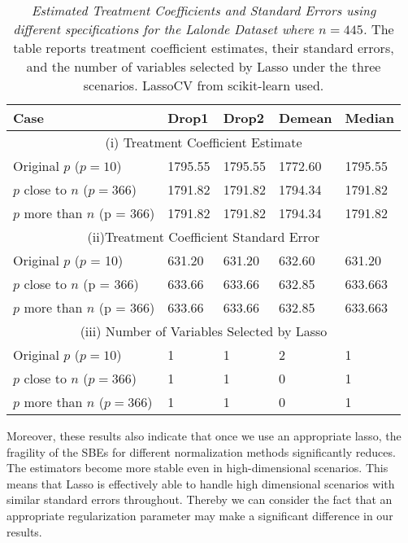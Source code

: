 \begin{table}[h!]
\renewcommand{\arraystretch}{1.5}
\centering
\begin{tabular}{||l l l l l||} 
 \hline
 \hline
 Case & Drop1 & Drop2 & Demean & Median \\ [0.5ex] 
 \hline \hline
 \multicolumn{5}{||c||}{(i) Treatment Coefficient Estimate} \\ [0.5ex]
 Original $p$ ($p = 10$) & 1795.55 & 1795.55 & 1772.60 & 1795.55  \\ 
 $p$ close to $n$ ($p = 366$) & 1791.82 & 1791.82 & 1794.34 & 1791.82 \\
 $p$ more than $n$ (p = 366) & 1791.82 & 1791.82 & 1794.34 & 1791.82  \\
 \hline
 \multicolumn{5}{||c||}{(ii)Treatment Coefficient Standard Error} \\ [0.5ex]
 Original $p$ ($p$ = 10) & 631.20 & 631.20 & 632.60 & 631.20 \\ 
 $p$ close to $n$ (p = 366) & 633.66 & 633.66& 632.85 & 633.663  \\
 $p$ more than $n$ (p = 366) & 633.66 & 633.66& 632.85 & 633.663 \\
 \hline
 \multicolumn{5}{||c||}{(iii) Number of Variables Selected by Lasso} \\ [0.5ex]
 Original $p$ ($p = 10$) & 1 & 1 & 2 & 1 \\ 
 $p$ close to $n$ ($p = 366$) & 1 & 1 & 0 & 1 \\
 $p$ more than $n$ ($p = 366$) & 1 & 1 & 0 & 1 \\
 \hline \hline
\end{tabular}
\caption{\textit{Estimated Treatment Coefficients and Standard Errors using different specifications for the Lalonde Dataset where $n = 445$.} The table reports treatment coefficient estimates, their standard errors, and the number of variables selected by Lasso under the three scenarios. LassoCV from scikit-learn used.}
\label{table:1}
\end{table}

Moreover, these results also indicate that once we use an appropriate lasso, the fragility of the SBEs for different normalization methods significantly reduces. The estimators become more stable even in high-dimensional scenarios. This means that Lasso is effectively able to handle high dimensional scenarios with similar standard errors throughout. Thereby we can consider the fact that an appropriate regularization parameter may make a significant difference in our results. 

